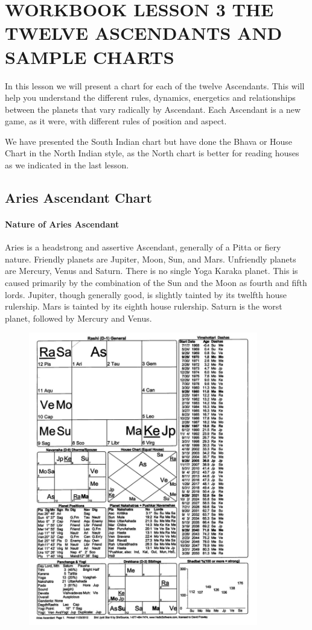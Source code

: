 \section{WORKBOOK LESSON 3
THE TWELVE ASCENDANTS AND SAMPLE CHARTS}
 

In this lesson we will present a chart for each of the twelve Ascendants. This will help you understand the different rules, dynamics, energetics and relationships between the planets that vary radically by Ascendant. Each Ascendant is a new game, as it were, with different rules of position and aspect.

We have presented the South Indian chart but have done the Bhava or House Chart in the North Indian style, as the North chart is better for reading houses as we indicated in the last lesson.

 

\subsection{Aries Ascendant Chart}
 

\paragraph{Nature of Aries Ascendant}

 

Aries is a headstrong and assertive Ascendant, generally of a Pitta or fiery nature. Friendly planets are Jupiter, Moon, Sun, and Mars. Unfriendly planets are Mercury, Venus and Saturn. There is no single Yoga Karaka planet. This is caused primarily by the combination of the Sun and the Moon as fourth and fifth lords. Jupiter, though generally good, is slightly tainted by its twelfth house rulership. Mars is tainted by its eighth house rulership. Saturn is the worst planet, followed by Mercury and Venus.

 
\begin{figure}[h]
\centering
\includegraphics[width=10cm]{pics/Aries-Ascendant.jpg}
\caption{}
\end{figure}


